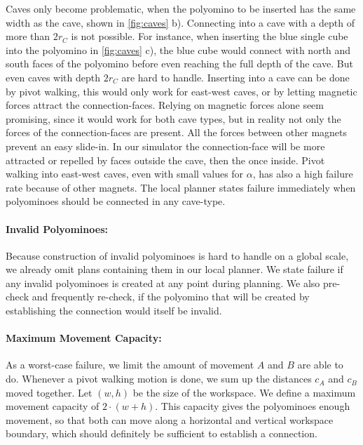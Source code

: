 Caves only become problematic, when the polyomino to be inserted has the same width as the cave, shown in \autoref{fig:caves} b).
Connecting into a cave with a depth of more than $2 r_C$ is not possible.
For instance, when inserting the blue single cube into the polyomino in \autoref{fig:caves} c), the blue cube would connect with north and south faces of the polyomino before even reaching the full depth of the cave.
But even caves with depth $2 r_C$ are hard to handle.
Inserting into a cave can be done by pivot walking, this would only work for east-west caves, or by letting magnetic forces attract the connection-faces.
Relying on magnetic forces alone seem promising, since it would work for both cave types, but in reality not only the forces of the connection-faces are present.
All the forces between other magnets prevent an easy slide-in.
In our simulator the connection-face will be more attracted or repelled by faces outside the cave, then the once inside.
Pivot walking into east-west caves, even with small values for $\alpha$, has also a high failure rate because of other magnets.
The local planner states failure immediately when polyominoes should be connected in any cave-type.

\paragraph{Invalid Polyominoes:}

Because construction of invalid polyominoes is hard to handle on a global scale, we already omit plans containing them in our local planner.
We state failure if any invalid polyominoes is created at any point during planning.
We also pre-check and frequently re-check, if the polyomino that will be created by establishing the connection would itself be invalid. 

\paragraph{Maximum Movement Capacity:}

As a worst-case failure, we limit the amount of movement $A$ and $B$ are able to do.
Whenever a pivot walking motion is done, we sum up the distances $c_A$ and $c_B$ moved together.
Let $(w,h)$ be the size of the workspace.
We define a maximum movement capacity of $2\cdot(w+h)$.
This capacity gives the polyominoes enough movement, so that both can move along a horizontal and vertical workspace boundary, which should definitely be sufficient to establish a connection.

